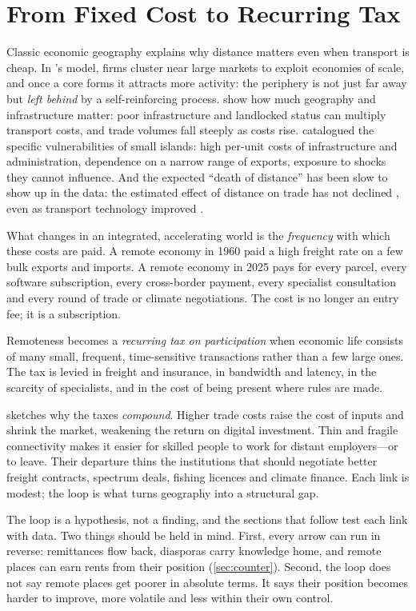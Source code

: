 \section{From Fixed Cost to Recurring Tax}
\label{sec:tax}

Classic economic geography explains why distance matters even when transport
is cheap. In \citeauthor{krugman1991}'s \parencite*{krugman1991} model, firms
cluster near large markets to exploit economies of scale, and once a core
forms it attracts more activity: the periphery is not just far away but
\emph{left behind} by a self-reinforcing process. \textcite{limao2001} show
how much geography and infrastructure matter: poor infrastructure and
landlocked status can multiply transport costs, and trade volumes fall
steeply as costs rise. \textcite{briguglio1995} catalogued the specific
vulnerabilities of small islands: high per-unit costs of infrastructure and
administration, dependence on a narrow range of exports, exposure to shocks
they cannot influence. And the expected \enquote{death of distance} has been
slow to show up in the data: the estimated effect of distance on trade has
not declined \parencite{disdier2008}, even as transport technology improved
\parencite{hummels2007}.

What changes in an integrated, accelerating world is the \emph{frequency}
with which these costs are paid. A remote economy in 1960 paid a high freight
rate on a few bulk exports and imports. A remote economy in 2025 pays for
every parcel, every software subscription, every cross-border payment, every
specialist consultation and every round of trade or climate negotiations.
The cost is no longer an entry fee; it is a subscription.

\begin{keyidea}
Remoteness becomes a \emph{recurring tax on participation} when economic life
consists of many small, frequent, time-sensitive transactions rather than a
few large ones. The tax is levied in freight and insurance, in bandwidth and
latency, in the scarcity of specialists, and in the cost of being present
where rules are made.
\end{keyidea}

 sketches why the taxes \emph{compound}. Higher trade costs
raise the cost of inputs and shrink the market, weakening the return on
digital investment. Thin and fragile connectivity makes it easier for
skilled people to work for distant employers---or to leave. Their departure
thins the institutions that should negotiate better freight contracts,
spectrum deals, fishing licences and climate finance. Each link is modest; the
loop is what turns geography into a structural gap.



The loop is a hypothesis, not a finding, and the sections that follow test
each link with data. Two things should be held in mind. First, every arrow can
run in reverse: remittances flow back, diasporas carry knowledge home, and
remote places can earn rents from their position (\cref{sec:counter}).
Second, the loop does not say remote places get poorer in absolute terms. It
says their position becomes harder to improve, more volatile and less within
their own control.
